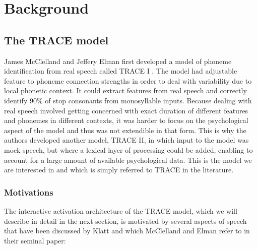 
\chapter{Background}


\section{The TRACE model}

James McClelland and Jeffery Elman first developed a model of phoneme identification from real speech called TRACE I \citep{elman1986exploiting}. The model had adjustable feature to phoneme connection strengths in order to deal with variability due to local phonetic context. It could extract features from real speech and correctly identify 90\% of stop consonants from monosyllable inputs.
Because dealing with real speech involved getting concerned with exact duration of different features and phonemes in different contexts, it was harder to focus on the psychological aspect of the model and thus was not extendible in that form. This is why the authors developed another model, TRACE II, in which input to the model was mock speech, but where a lexical layer of processing could be added, enabling to account for a large amount of available psychological data. This is the model we are interested in and which is simply referred to TRACE in the literature.


\subsection{Motivations}

The interactive activation architecture of the TRACE model, which we will describe in detail in the next section, is motivated by several aspects of speech that have been discussed by Klatt \citep{klatt1979speech} and which McClelland and Elman refer to in their seminal paper:

